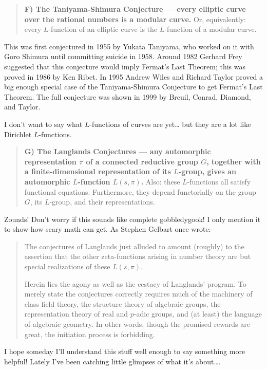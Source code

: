 \documentclass{article}
\begin{document}
\begin{quote}
\textbf{F) The Taniyama-Shimura Conjecture --- every elliptic curve over
the rational numbers is a modular curve.} Or, equivalently: every
\(L\)-function of an elliptic curve is the \(L\)-function of a modular
curve.
\end{quote}

This was first conjectured in 1955 by Yukata Taniyama, who worked on it
with Goro Shimura until committing suicide in 1958. Around 1982 Gerhard
Frey suggested that this conjecture would imply Fermat's Last Theorem;
this was proved in 1986 by Ken Ribet. In 1995 Andrew Wiles and Richard
Taylor proved a big enough special case of the Taniyama-Shimura
Conjecture to get Fermat's Last Theorem. The full conjecture was shown
in 1999 by Breuil, Conrad, Diamond, and Taylor.

I don't want to say what \(L\)-functions of curves are yet\ldots{} but
they are a lot like Dirichlet \(L\)-functions.

\begin{quote}
\textbf{G) The Langlands Conjectures --- any automorphic representation
\(\pi\) of a connected reductive group \(G\), together with a
finite-dimensional representation of its \(L\)-group, gives an
automorphic \(L\)-function \(L(s,\pi)\).} Also: these \(L\)-functions
all satisfy functional equations. Furthermore, they depend functorially
on the group \(G\), its \(L\)-group, and their representations.
\end{quote}

Zounds! Don't worry if this sounds like complete gobbledygook! I only
mention it to show how scary math can get. As Stephen Gelbart once
wrote:

\begin{quote}
The conjectures of Langlands just alluded to amount (roughly) to the
assertion that the other zeta-functions arising in number theory are but
special realizations of these \(L(s,\pi)\).

Herein lies the agony as well as the ecstacy of Langlands' program. To
merely state the conjectures correctly requires much of the machinery of
class field theory, the structure theory of algebraic groups, the
representation theory of real and \(p\)-adic groups, and (at least) the
language of algebraic geometry. In other words, though the promised
rewards are great, the initiation process is forbidding.
\end{quote}

I hope someday I'll understand this stuff well enough to say something
more helpful! Lately I've been catching little glimpses of what it's
about\ldots.
\end{document}
